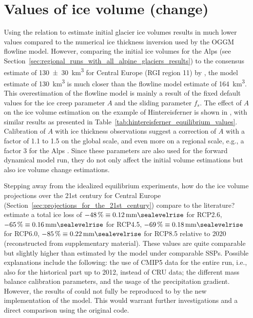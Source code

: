     \section{Values of ice volume (change)} %
    \label{sec:relative_and_absolute_values_of_ice_volume_change}

        Using the \vas{} relation to estimate initial glacier ice volumes results in much lower values compared to the numerical ice thickness inversion \citep[cf.][]{Farinotti2009} used by the OGGM flowline model. However, comparing the initial ice volumes for the Alps (see Section~\ref{sec:regional_runs_with_all_alpine_glaciers_results}) to the consensus estimate of 130\SI{\pm30}{\cubic\kilo\meter} for Central Europe (RGI region 11) by \citet{Farinotti2019}, the \vas{} model estimate of \SI{130}{\cubic\kilo\meter} is much closer than the flowline model estimate of \SI{164}{\cubic\kilo\meter}. This overestimation of the flowline model is mainly a result of the fixed default values for the ice creep parameter $A$ and the sliding parameter $f_s$. The effect of $A$ on the ice volume estimation on the example of Hintereisferner is shown in \citet[Figure 6]{Maussion2019}, with similar results as presented in Table~\ref{tab:hintereisferner_equilibrium_values}. Calibration of $A$ with ice thickness observations suggest a correction of $A$ with a factor of 1.1 to 1.5 on the global scale, and even more on a regional scale, e.g., a factor 3 for the Alps \citep{OGGM-pitfalls}. Since these parameters are also used for the forward dynamical model run, they do not only affect the initial volume estimations but also ice volume change estimations.

        Stepping away from the idealized equilibrium experiments, how do the ice volume projections over  the 21st century for Central Europe (Section~\ref{sec:projections_for_the_21st_century}) compare to the literature? \citet[cf. Figure 21]{Marzeion2012b} estimate a total ice loss of $\SI{-48}{\percent} \equiv \SI{0.12}{\milli\meter\sealevelrise}$ for RCP2.6, $\SI{-65}{\percent} \equiv \SI{0.16}{\milli\meter\sealevelrise}$ for RCP4.5, $\SI{-69}{\percent} \equiv \SI{0.18}{\milli\meter\sealevelrise}$ for RCP6.0, $\SI{-85}{\percent} \equiv \SI{0.22}{\milli\meter\sealevelrise}$ for RCP8.5 relative to 2020 (reconstructed from supplementary material). These values are quite comparable but slightly higher than estimated by the \vas{} model under comparable SSPs. Possible explanations include the following: the use of CMIP5 data for the entire run, i.e., also for the historical part up to 2012, instead of CRU data; the different mass balance calibration parameters, and the usage of the precipitation gradient. However, the results of \citet{Marzeion2012b} could not fully be reproduced to by the new implementation of the \vas{} model. This would warrant further investigations and a direct comparison using the original code.

